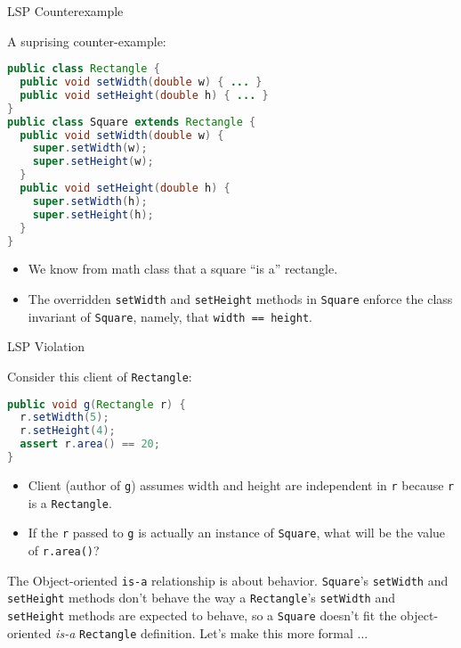 \documentclass{beamer}
\begin{document}
\begin{frame}[fragile]{LSP Counterexample}

A suprising counter-example:
\vspace{-.05in}
\begin{lstlisting}[language=Java]
public class Rectangle {
  public void setWidth(double w) { ... }
  public void setHeight(double h) { ... }
}
public class Square extends Rectangle {
  public void setWidth(double w) {
    super.setWidth(w);
    super.setHeight(w);
  }
  public void setHeight(double h) {
    super.setWidth(h);
    super.setHeight(h);
  }
}
\end{lstlisting}
\vspace{-.1in}
\begin{itemize}
\item We know from math class that a square ``is a'' rectangle. 
\item The overridden {\tt setWidth} and {\tt setHeight} methods in {\tt Square} enforce the class invariant of {\tt Square}, namely, that {\tt width == height}.
\end{itemize}


\end{frame}

\begin{frame}[fragile]{LSP Violation}


Consider this client of {\tt Rectangle}:
\begin{lstlisting}[language=Java]
public void g(Rectangle r) {
  r.setWidth(5);
  r.setHeight(4);
  assert r.area() == 20;
}
\end{lstlisting}

\begin{itemize}
\item Client (author of {\tt g}) assumes width and height are independent in {\tt r} because {\tt r} is a {\tt Rectangle}.
\item If the {\tt r} passed to {\tt g} is actually an instance of {\tt Square}, what will be the value of {\tt r.area()}?
\end{itemize}
The Object-oriented {\tt is-a} relationship is about behavior.  {\tt Square}'s {\tt setWidth} and {\tt setHeight} methods don't behave the way a {\tt Rectangle}'s {\tt setWidth} and {\tt setHeight} methods are expected to behave, so a {\tt Square} doesn't fit the object-oriented {\it is-a} {\tt Rectangle} definition.  Let's make this more formal ...

\end{frame}
\end{document}
